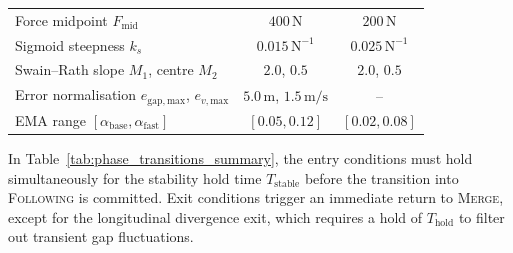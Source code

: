 \documentclass[12pt,a4paper,oneside]{report}
\begin{document}
\begin{table}[H]
\begin{tabular}{lcc}
Force midpoint $F_{\mathrm{mid}}$              & $400\,\mathrm{N}$  & $200\,\mathrm{N}$      \\
Sigmoid steepness $k_s$                        & $0.015\,\mathrm{N}^{-1}$ & $0.025\,\mathrm{N}^{-1}$ \\
Swain--Rath slope $M_1$, centre $M_2$          & $2.0$, $0.5$       & $2.0$, $0.5$           \\
Error normalisation $e_{\mathrm{gap,max}}$, $e_{v,\mathrm{max}}$ & $5.0\,\mathrm{m}$, $1.5\,\mathrm{m/s}$ & -- \\
EMA range $[\alpha_{\mathrm{base}}, \alpha_{\mathrm{fast}}]$ & $[0.05, 0.12]$ & $[0.02, 0.08]$ \\
\hline
\end{tabular}
\end{table}


In Table~\ref{tab:phase_transitions_summary}, the entry conditions must hold simultaneously for the stability hold time $T_{\mathrm{stable}}$ before the transition into \textsc{Following} is committed. Exit conditions trigger an immediate return to \textsc{Merge}, except for the longitudinal divergence exit, which requires a hold of $T_{\mathrm{hold}}$ to filter out transient gap fluctuations.
\end{document}
